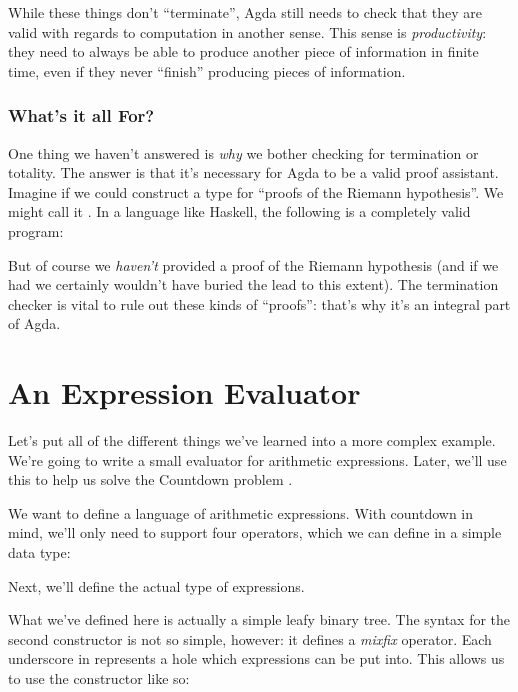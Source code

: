 While these things don't ``terminate'', Agda still needs to check that they are
valid with regards to computation in another sense.
This sense is \emph{productivity}: they need to always be able to produce
another piece of information in finite time, even if they never ``finish''
producing pieces of information.
\subsubsection{What's it all For?}
One thing we haven't answered is \emph{why} we bother checking for termination
or totality.
The answer is that it's necessary for Agda to be a valid proof assistant.
Imagine if we could construct a type for ``proofs of the Riemann hypothesis''.
We might call it .
In a language like Haskell, the following is a completely valid program:
\begin{agdalisting*}
\end{agdalisting*}
But of course we \emph{haven't} provided a proof of the Riemann hypothesis (and
if we had we certainly wouldn't have buried the lead to this extent).
The termination checker is vital to rule out these kinds of ``proofs'': that's
why it's an integral part of Agda.
\section{An Expression Evaluator}
Let's put all of the different things we've learned into a more complex example.
We're going to write a small evaluator for arithmetic expressions.
Later, we'll use this to help us solve the Countdown problem
\citep{huttonCountdownProblem2002}.

We want to define a language of arithmetic expressions.
With countdown in mind, we'll only need to support four operators, which we can
define in a simple data type:
\begin{agdalisting}
\end{agdalisting}
Next, we'll define the actual type of expressions.
\begin{agdalisting}
\end{agdalisting}
What we've defined here is actually a simple leafy binary tree.
The syntax for the second constructor is not so simple, however: it defines a
\emph{mixfix} operator.
Each underscore in \AgdaInductiveConstructor{\(\_\langle \_ \rangle\_\)}
represents a hole which expressions can be put into.
This allows us to use the constructor like so:
\begin{agdalisting*}
\end{agdalisting*}

